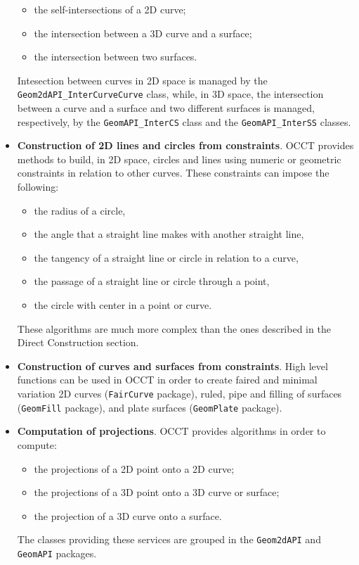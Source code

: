 \begin{itemize}
\begin{itemize}
	\item the self-intersections of a 2D curve;
	\item the intersection between a 3D curve and a surface;
	\item the intersection between two surfaces.
	\end{itemize}
Intesection between curves in 2D space is managed by the \lstinline[language=Java]!Geom2dAPI_InterCurveCurve! class, while, in 3D space, the intersection between a curve and a surface and two different surfaces is managed, respectively, by the \lstinline[language=Java]!GeomAPI_InterCS! class and the \lstinline[language=Java]!GeomAPI_InterSS! classes.
\item \textbf{Construction of 2D lines and circles from constraints}. \gls{OCCT} provides methods to build, in 2D space, circles and lines using numeric or geometric constraints in relation to other curves. These constraints can impose the following:
	\begin{itemize}
	\item the radius of a circle,
	\item the angle that a straight line makes with another straight line,
	\item the tangency of a straight line or circle in relation to a curve,
	\item the passage of a straight line or circle through a point,
	\item the circle with center in a point or curve.
	\end{itemize}
These algorithms are much more complex than the ones described in the Direct Construction section.
\item \textbf{Construction of curves and surfaces from constraints}. High level functions can be used in \gls{OCCT} in order to create faired and minimal variation 2D curves (\lstinline[language=Java]!FairCurve! package), ruled, pipe and filling of surfaces (\lstinline[language=Java]!GeomFill! package), and plate surfaces (\lstinline[language=Java]!GeomPlate! package).
\item \textbf{Computation of projections}. \gls{OCCT} provides algorithms in order to compute:
	\begin{itemize}
	\item the projections of a 2D point onto a 2D curve;
	\item the projections of a 3D point onto a 3D curve or surface;
	\item the projection of a 3D curve onto a surface.
	\end{itemize}
The classes providing these services are grouped in the \lstinline[language=Java]!Geom2dAPI! and \lstinline[language=Java]!GeomAPI! packages.
\end{itemize}
%

